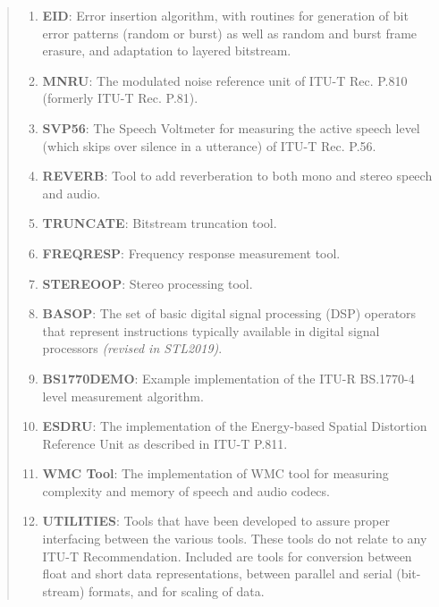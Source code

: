 \begin{quote}
\begin{enumerate}
\item {\bf EID}: Error insertion algorithm, with routines for generation of bit error patterns (random or burst) as well as random and burst frame erasure, and adaptation to layered bitstream.

\item {\bf MNRU}: The modulated noise reference unit of ITU-T Rec. P.810 (formerly ITU-T Rec. P.81).

\item {\bf SVP56}: The Speech Voltmeter for measuring the active speech level (which skips over silence in a utterance) of ITU-T Rec. P.56.

\item {\bf REVERB}: Tool to add reverberation to both mono and stereo speech and audio.

\item {\bf TRUNCATE}: Bitstream truncation tool.

\item {\bf FREQRESP}: Frequency response measurement tool.

\item {\bf STEREOOP}: Stereo processing tool.

\item {\bf BASOP}: The set of basic digital signal processing (DSP) operators that represent instructions typically available in digital signal processors \emph{(revised in STL2019)}.

\item {\bf BS1770DEMO}: Example implementation of the ITU-R BS.1770-4 level measurement algorithm.

\item {\bf ESDRU}: The implementation of the Energy-based Spatial Distortion Reference Unit as described in ITU-T P.811.

\item {\bf WMC Tool}: The implementation of WMC tool for measuring complexity and memory of speech and audio codecs.

\item {\bf UTILITIES}: Tools that have been developed to assure proper interfacing between the various tools.
These tools do not relate to any ITU-T Recommendation.
Included are tools for conversion between float and short data representations, between parallel and serial (bit-stream) formats, and for scaling of data.

\end{enumerate}
\end{quote}

